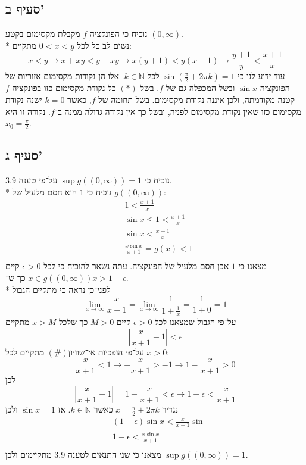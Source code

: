 \documentclass[a4paper]{article}
\def\NN{\mathbb{N}}
\begin{document}
\subsection{סעיף ב'}
נוכיח כי הפונקציה $f$ מקבלת מקסימום בקטע $(0, \infty)$. \\*
נשים לב כל לכל $0 < x < y$ מתקיים:
\[
	x < y \rightarrow
	x + xy < y + xy \rightarrow
	x (y + 1) < y (x + 1) \rightarrow
	\frac{y + 1}{y} < \frac{x + 1}{x} \tag{*}
\]
עוד ידוע לנו כי $\sin(\frac{\pi}{2} + 2\pi k) = 1$ לכל $k \in \NN$.
אלו הן נקודות מקסימום אזוריות של הפונקציה $\sin x$ ובשל המכפלה גם של $f$.
בשל $(*)$ כל נקודת מקסימום כזו בפונקציה $f$ קטנה מקודמתה, ולכן איננה נקודת מקסימום.
בשל תחומה של $f$, כאשר $k = 0$ ישנה נקודת מקסימום כזו שאין נקודת מקסימום לפניה, ובשל כך אין נקודה גדולה ממנה ב־$f$.
נקודה זו היא $x_0 = \frac{\pi}{2}$.

\subsection{סעיף ג'}
נוכיח כי $\sup g\left( (0, \infty) \right) = 1$ על־פי טענה 3.9. \\*
נוכיח כי $1$ הוא חסם מלעיל של $g((0, \infty))$:
\begin{align*}
	& 1 < \frac{x + 1}{x} \tag{\#} \\
	& \sin x \le 1 < \frac{x + 1}{x} \\
	& \sin x < \frac{x + 1}{x} \\
	& \frac{x \sin x}{x + 1} = g(x) < 1 \\
\end{align*}
מצאנו כי $1$ אכן חסם מלעיל של הפונקציה. עתה נשאר להוכיח כי לכל $\epsilon > 0$ קיים $x \in g((0, \infty))$ כך ש־$x > 1 - \epsilon$. \\*
לפני־כן נראה כי מתקיים הגבול
\[
	\lim_{x \to \infty} \frac{x}{x + 1}
	= \lim_{x \to \infty} \frac{1}{1 + \frac{1}{x}}
	= \frac{1}{1 + 0}
	= 1
\]
על־פי הגבול שמצאנו לכל $\epsilon > 0$ קיים $M > 0$ כך שלכל $x > M$ מתקיים
\[
	\left| \frac{x}{x + 1} - 1 \right| < \epsilon
\]
על־פי הופכיות אי־שוויון$(\#)$ מתקיים לכל $x > 0$:
\[
	\frac{x}{x + 1} < 1 \rightarrow
	-\frac{x}{x + 1} > -1 \rightarrow
	1 - \frac{x}{x + 1} > 0
\]
לכן
\[
	\left| \frac{x}{x + 1} - 1 \right| = 1 - \frac{x}{x + 1} < \epsilon
	\rightarrow 1 - \epsilon < \frac{x}{x + 1}
\]
נגדיר $x = \frac{\pi}{2} + 2\pi k$ כאשר $k \in \NN$.
אז $\sin x = 1$ ולכן
\begin{align*}
	& (1 - \epsilon) \sin x < \frac{x}{x + 1} \sin \\
	& 1 - \epsilon < \frac{x \sin x}{x + 1} \\
\end{align*}
מצאנו כי שני התנאים לטענה 3.9 מתקיימים ולכן $\sup g((0, \infty)) = 1$.
\end{document}
